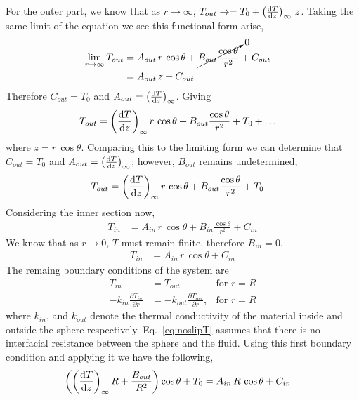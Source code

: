 \documentclass{article}
\begin{document}
For the outer part, we know that as $r\to\infty$, $T_{out}\to = T_0 +
\left(\frac{{\rm d}T}{{\rm d} z}\right)_{\infty}\,z$. Taking the same
limit of the equation we see this functional form arise,
\begin{align}
  \lim_{r\to\infty}T_{out} &= A_{out} \, r\,\cos \theta +  \cancelto{0}{B_{out}\frac{\cos{\theta}}{r^{2}}}  + C_{out}
  \\
  &= A_{out} \, z + C_{out} &
\end{align}
Therefore $C_{out}=T_0$ and $A_{out}=\left(\frac{{\rm d}T}{{\rm d}
  z}\right)_{\infty}$.
Giving 
\begin{align}
  T_{out} &= \left(\frac{{\rm d}T}{{\rm d}
    z}\right)_{\infty} r\,\cos \theta +  B_{out}\frac{\cos{\theta}}{r^{2}}  + T_0 + \ldots
\end{align}
where $z=r\,\cos\theta$. Comparing this to the limiting form we can
determine that $C_{out}=T_0$ and
$A_{out}=\left(\frac{{\rm d}T}{{\rm d} z}\right)_{\infty}$; however, $B_{out}$ remains undetermined,
\begin{align}
  T_{out} &=\left(\frac{{\rm d}T}{{\rm d}
    z}\right)_{\infty} r\,\cos \theta +  B_{out}\frac{\cos{\theta}}{r^{2}}  + T_0
\end{align}
Considering the inner section now,
\begin{align}
  T_{in} &= A_{in} \, r\,\cos \theta +  B_{in}\frac{\cos{\theta}}{r^{2}}  + C_{in}
\end{align}
We know that as $r\to0$, $T$ must remain finite, therefore $B_{in}=0$.
\begin{align}
  T_{in} &= A_{in} \, r\,\cos \theta  + C_{in}
\end{align}
The remaing boundary conditions of the system are
\begin{align}
  T_{in} &= T_{out} & \text{for $r=R$} \label{eq:noslipT}
  \\
  - k_{in} \frac{\partial T_{in}}{\partial r} &= - k_{out} \frac{\partial T_{out}}{\partial r}, & \text{for $r=R$}
\end{align}
where $k_{in}$, and $k_{out}$ denote the thermal conductivity of the
material inside and outside the sphere
respectively. Eq.~\ref{eq:noslipT} assumes that there is no
interfacial resistance between the sphere and the fluid. Using this
first boundary condition and applying it we have the following,
\begin{align}
  \left(\left(\frac{{\rm d}T}{{\rm d}
  z}\right)_{\infty} R +  \frac{B_{out}}{R^{2}}\right)\cos \theta  + T_0 &= A_{in} \, R\,\cos \theta  + C_{in}
\end{align}
\end{document}
